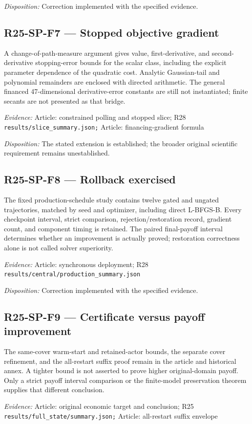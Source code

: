 \emph{Disposition:} Correction implemented with the specified evidence.
\subsection{R25-SP-F7 --- Stopped objective gradient}
A change-of-path-measure argument gives value, first-derivative, and second-derivative stopping-error bounds for the scalar class, including the explicit parameter dependence of the quadratic cost. Analytic Gaussian-tail and polynomial remainders are enclosed with directed arithmetic. The general financed 47-dimensional derivative-error constants are still not instantiated; finite secants are not presented as that bridge.

\emph{Evidence:} Article: constrained polling and stopped slice; R28 \nolinkurl{results/slice_summary.json;} Article: financing-gradient formula

\emph{Disposition:} The stated extension is established; the broader original scientific requirement remains unestablished.
\subsection{R25-SP-F8 --- Rollback exercised}
The fixed production-schedule study contains twelve gated and ungated trajectories, matched by seed and optimizer, including direct L-BFGS-B. Every checkpoint interval, strict comparison, rejection/restoration record, gradient count, and component timing is retained. The paired final-payoff interval determines whether an improvement is actually proved; restoration correctness alone is not called solver superiority.

\emph{Evidence:} Article: synchronous deployment; R28 \nolinkurl{results/central/production_summary.json}

\emph{Disposition:} Correction implemented with the specified evidence.
\subsection{R25-SP-F9 --- Certificate versus payoff improvement}
The same-cover warm-start and retained-actor bounds, the separate cover refinement, and the all-restart suffix proof remain in the article and historical annex. A tighter bound is not asserted to prove higher original-domain payoff. Only a strict payoff interval comparison or the finite-model preservation theorem supplies that different conclusion.

\emph{Evidence:} Article: original economic target and conclusion; R25 \nolinkurl{results/full_state/summary.json;} Article: all-restart suffix envelope

